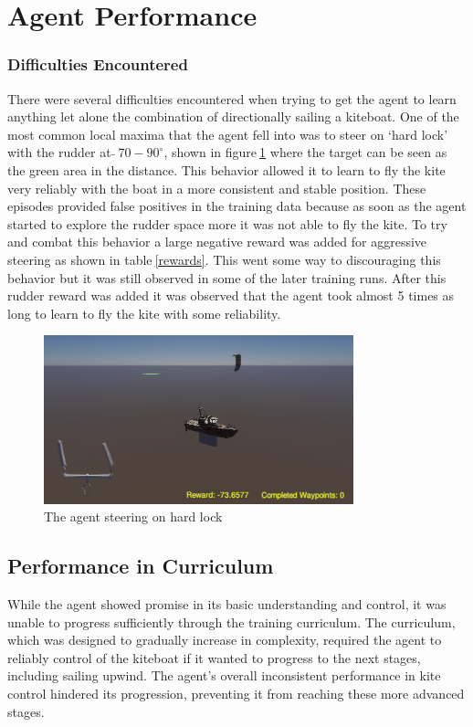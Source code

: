 \section{Agent Performance}

\subsubsection*{Difficulties Encountered}
There were several difficulties encountered when trying to get the agent to learn anything let alone the combination of directionally sailing a kiteboat. One of the most common local maxima that the agent fell into was to steer on `hard lock' with the rudder at \textit{$\tilde{} ~70-90^{\circ}$}, shown in figure$~$\ref{hard_lock} where the target can be seen as the green area in the distance. This behavior allowed it to learn to fly the kite very reliably with the boat in a more consistent and stable position. These episodes provided false positives in the training data because as soon as the agent started to explore the rudder space more it was not able to fly the kite. To try and combat this behavior a large negative reward was added for aggressive steering as shown in table$~$\ref{rewards}. This went some way to discouraging this behavior but it was still observed in some of the later training runs. After this rudder reward was added it was observed that the agent took almost 5 times as long to learn to fly the kite with some reliability. 
\begin{figure}[!htb]
    \centering
    \includegraphics[width=0.8\textwidth]{Images/hard_lock.png}
    \caption{The agent steering on hard lock}\label{hard_lock}
\end{figure}

\subsection*{Performance in Curriculum}
While the agent showed promise in its basic understanding and control, it was unable to progress sufficiently through the training curriculum. The curriculum, which was designed to gradually increase in complexity, required the agent to reliably control of the kiteboat if it wanted to progress to the next stages, including sailing upwind. The agent's overall inconsistent performance in kite control hindered its progression, preventing it from reaching these more advanced stages.


